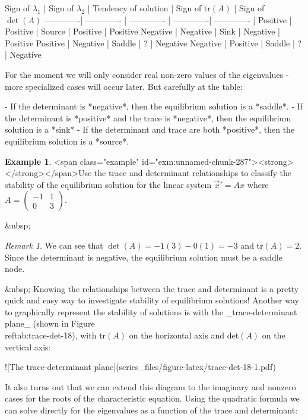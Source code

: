 \documentclass[
]{book}
\theoremstyle{definition}
\theoremstyle{definition}
\newtheorem{example}{Example}[chapter]
\theoremstyle{definition}
\theoremstyle{remark}
\newtheorem*{remark}{Remark}
\begin{document}
Sign of $\lambda_{1}$ | Sign of $\lambda_{2}$  | Tendency of solution | Sign of tr$(A)$ | Sign of $\det(A)$
-------------| ------------- | ------------- | -------------| ------------- |
    Positive | Positive | Source | Positive | Positive
    Negative |  Negative | Sink | Negative | Positive
   Positive  | Negative | Saddle | ? | Negative
    Negative |  Positive | Saddle | ? | Negative
   
For the moment we will only consider real non-zero values of the eigenvalues - more specialized cases will occur later.  But carefully at the table:

- If the determinant is *negative*, then the equilibrium solution is a *saddle*.
- If the determinant is *positive* and the trace is *negative*, then the equilibrium solution is a *sink*
- If the determinant and trace are both *positive*, then the equilibrium solution is a *source*.

\begin{example}
<span class="example" id="exm:unnamed-chunk-287"><strong>\label{exm:unnamed-chunk-287} </strong></span>Use the trace and determinant relationships to classify the stability of the equilibrium solution for the linear system $\vec{x}'=Ax$ where $\displaystyle A=  \begin{pmatrix} -1 & 1 \\ 0 &  3 \end{pmatrix}$.
\end{example}
&nbsp;
\begin{remark}
{}We can see that $\det(A)= -1(3) - 0(1) = -3$ and tr$(A)=2$.  Since the determinant is negative, the equilibrium solution must be a saddle node.
\end{remark}

&nbsp;
Knowing the relationships between the trace and determinant is a pretty quick and easy way to investigate stability of equilibrium solutions! Another way to graphically represent the stability of solutions is with the _trace-determinant plane_ (shown in Figure \\ref{tab:trace-det-18}), with tr$(A)$ on the horizontal axis and det$(A)$ on the vertical axis:

![\label{fig:trace-det-18}The trace-determinant plane](series_files/figure-latex/trace-det-18-1.pdf) 


It also turns out that we can extend this diagram to the imaginary and nonzero cases for the roots of the characteristic equation.  Using the quadratic formula we can solve directly for the eigenvalues as a function of the trace and determinant:
\end{document}
